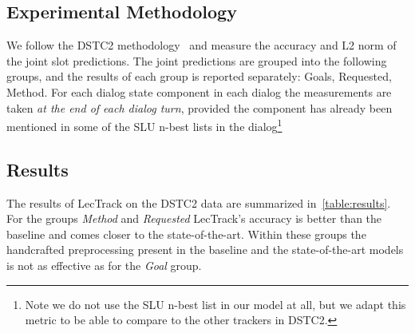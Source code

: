 \documentclass[10pt,twocolumn]{article}
\begin{document}
\subsection{Experimental Methodology}  %
We follow the DSTC2 methodology~\cite{henderson2014second} and measure the accuracy and L2 norm of the joint slot predictions.
The joint predictions are grouped into the following groups, and the results of each group is reported separately: Goals, Requested, Method.
For each dialog state component in each dialog the measurements are taken \emph{at the end of each dialog turn}, provided the component has already been mentioned in some of the SLU n-best lists in the dialog\footnote{Note we do not use the SLU n-best list in our model at all, but we adapt this metric to be able to compare to the other trackers in DSTC2.}


\subsection{Results}
The results of LecTrack on the DSTC2 data are summarized in~\autoref{table:results}. For the groups \emph{Method} and \emph{Requested} LecTrack's accuracy is better than the baseline and comes closer to the state-of-the-art. Within these groups the handcrafted preprocessing present in the baseline and the state-of-the-art models is not as effective as for the \emph{Goal} group.
\end{document}
